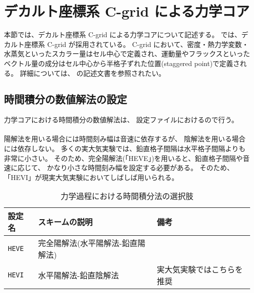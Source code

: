 \section{デカルト座標系 C-grid による力学コア} \label{sec:atmos_dyn_cartesC}
本節では、デカルト座標系 C-grid による力学コアについて記述する。
\scalerm では、デカルト座標系 C-grid が採用されている。
C-grid において、密度・熱力学変数・水蒸気といったスカラー量はセル中心で定義され、運動量やフラックスといったベクトル量の成分はセル中心から半格子ずれた位置(staggered point)で定義される。
詳細については、 \scalerm の記述文書を参照されたい。


\subsection{時間積分の数値解法の設定}  %
力学コアにおける時間積分の数値解法は、
設定ファイルにおけるので行う。\\

\\

陽解法を用いる場合には時間刻み幅は音速に依存するが、
陰解法を用いる場合には依存しない。
多くの実大気実験では、鉛直格子間隔は水平格子間隔よりも非常に小さい。
そのため、完全陽解法(「HEVE」)を用いると、鉛直格子間隔や音速に応じて、
かなり小さな時間刻み幅を設定する必要がある。
そのため、「HEVI」が現実大気実験においてしばしば用いられる。

\begin{table}[h]
\begin{center}
  \caption{力学過程における時間積分法の選択肢}
  \label{tab:nml_dyn}
  \begin{tabularx}{150mm}{llX} \hline
    \rowcolor[gray]{0.9}  設定名 & スキームの説明 & 備考\\ \hline
      \verb|HEVE|  & 完全陽解法(水平陽解法-鉛直陽解法) & \\
      \verb|HEVI|  & 水平陽解法-鉛直陰解法 & 実大気実験ではこちらを推奨\\
    \hline
  \end{tabularx}
\end{center}
\end{table}


